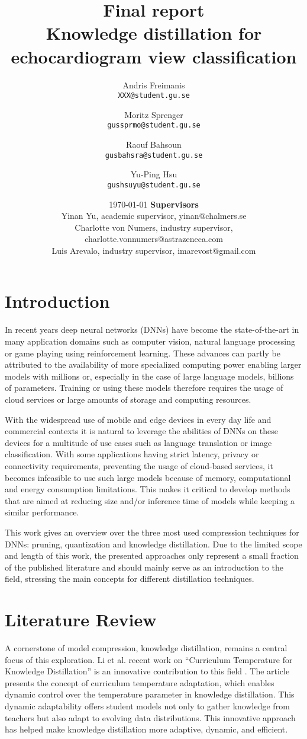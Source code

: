 \documentclass{article}
\title{Final report \\ Knowledge distillation for echocardiogram view classification}
\author{
  Andris Freimanis\\
  \texttt{XXX@student.gu.se}
  \and
  Moritz Sprenger\\
  \texttt{gussprmo@student.gu.se}
  \and
  Raouf Bahsoun\\
  \texttt{gusbahsra@student.gu.se}
  \and
  Yu-Ping Hsu\\
  \texttt{gushsuyu@student.gu.se}
}
\date{\today \endgraf\bigskip\vspace*{12cm}
	\textbf{Supervisors}\\
	\centering Yinan Yu, academic supervisor, yinan@chalmers.se \\
	Charlotte von Numers, industry supervisor, charlotte.vonnumers@astrazeneca.com \\
	Luis Arevalo, industry supervisor, imarevost@gmail.com}
\begin{document}
\maketitle

\newpage
\tableofcontents
\newpage
\section{Introduction}
In recent years deep neural networks (DNNs) have become the state-of-the-art in many application domains such as computer vision, natural language processing or game playing using reinforcement learning. These advances can partly be attributed to the availability of more specialized computing power enabling larger models with millions or, especially in the case of large language models, billions of parameters. Training or using these models therefore requires the usage of cloud services or large amounts of storage and computing resources.

With the widespread use of mobile and edge devices in every day life and commercial contexts it is natural to leverage the abilities of DNNs on these devices for a multitude of use cases such as language translation or image classification. With some applications having strict latency, privacy or connectivity requirements, preventing the usage of cloud-based services, it becomes infeasible to use such large models because of memory, computational and energy consumption limitations. This makes it critical to develop methods that are aimed at reducing size and/or inference time of models while keeping a similar performance.

This work gives an overview over the three most used compression techniques for DNNs: pruning, quantization and knowledge distillation. Due to the limited scope and length of this work, the presented approaches only represent a small fraction of the published literature and should mainly serve as an introduction to the field, stressing the main concepts for different distillation techniques.
\newpage
\section{Literature Review}
A cornerstone of model compression, knowledge distillation, remains a central focus of this exploration. Li et al. recent work on “Curriculum Temperature for Knowledge Distillation” is an innovative contribution to this field \cite{li2023curriculum}. The article presents the concept of curriculum temperature adaptation, which enables dynamic control over the temperature parameter in knowledge distillation. This dynamic adaptability offers student models not only to gather knowledge from teachers but also adapt to evolving data distributions. This innovative approach has helped make knowledge distillation more adaptive, dynamic, and efficient.
\end{document}
